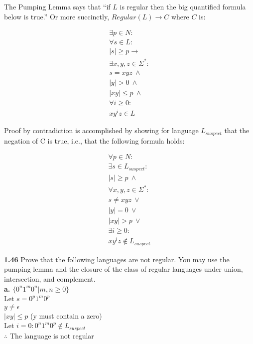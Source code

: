 \documentclass{article}
\begin{document}

The Pumping Lemma says that ``if $L$ is regular then the big quantified formula below is true.''  Or more succinctly, $Regular(L) \rightarrow C$ where $C$ is:

\begin{center}\[
\begin{array}{r}
\exists p \in N :\\
\forall s \in L : \\
|s| \geq p \rightarrow \\
\exists x, y, z \in \Sigma^* : \\
s = xyz\ \land \\
|y| > 0\ \land \\
|xy| \leq p\ \land \\
\forall i \geq 0 : \\
xy^iz \in L
\end{array}\]
\end{center}

Proof by contradiction is accomplished by showing for language $L_{suspect}$ that the negation of C is true, i.e., that the following formula holds:

\begin{center}\[
\begin{array}{r}
\forall p \in N :\\
\exists s \in L_{suspect} : \\
|s| \geq p\ \land \\
\forall x, y, z \in \Sigma^* : \\
s \neq xyz\ \lor \\
|y| = 0\ \lor \\
|xy| > p\ \lor \\
\exists i \geq 0 : \\
xy^iz \notin L_{suspect}
\end{array}\]
\end{center}


{\bf1.46} Prove that the following languages are not regular. You may use the pumping lemma and the closure of the class of regular languages under union, intersection, and complement.\\
{\bf a.} $\{0^{n}1^{m}0^{n} | m,n \geq 0\}$\\
\subitem Let $s = 0^{p}1^{m}0^{p}$\\
$y \neq \epsilon$\\
$|xy| \leq p$ (y must contain a zero)\\
Let $i = 0 : 0^{n}1^{m}0^{p} \notin L_{suspect}$\\
$\therefore$ The language is not regular\\
\end{document}
